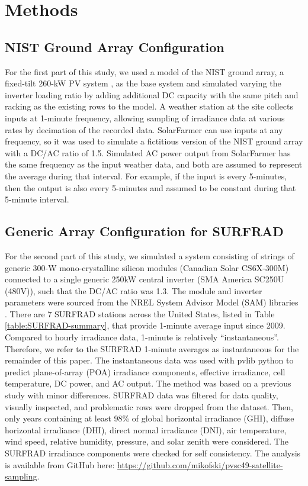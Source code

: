\documentclass[conference]{IEEEtran}
\begin{document}
\section{Methods}

\subsection{NIST Ground Array Configuration}
For the first part of this study, we used a model of the NIST ground array, a fixed-tilt 260-kW PV system \cite{Boyd2017,Boyd2017a,Boyd2017b}, as the base system and simulated varying the inverter loading ratio by adding additional DC capacity with the same pitch and racking as the existing rows to the model. A weather station at the site collects inputs at 1-minute frequency, allowing sampling of irradiance data at various rates by decimation of the recorded data. SolarFarmer \cite{solarfarmer2018} can use inputs at any frequency, so it was used to simulate a fictitious version of the NIST ground array with a DC/AC ratio of 1.5. Simulated AC power output from SolarFarmer has the same frequency as the input weather data, and both are assumed to represent the average during that interval. For example, if the input is every 5-minutes, then the output is also every 5-minutes and assumed to be constant during that 5-minute interval.

\subsection{Generic Array Configuration for SURFRAD}
For the second part of this study, we simulated a system consisting of strings of generic 300-W mono-crystalline silicon modules (Canadian Solar CS6X-300M) connected to a single generic 250kW central inverter (SMA America SC250U (480V)), such that the DC/AC ratio was 1.3. The module and inverter parameters were sourced from the NREL System Advisor Model (SAM) libraries \cite{Freeman2018}. There are 7 SURFRAD \cite{Augustine2000} stations across the United States, listed in Table \ref{table:SURFRAD-summary}, that provide 1-minute average input since 2009. Compared to hourly irradiance data, 1-minute is relatively ``instantaneous''. Therefore, we refer to the SURFRAD 1-minute averages as instantaneous for the remainder of this paper. The instantaneous data was used with pvlib python \cite{pvlib2018} to predict plane-of-array (POA) irradiance components, effective irradiance, cell temperature, DC power, and AC output. The method was based on a previous study \cite{9519024} with minor differences. SURFRAD data was filtered for data quality, visually inspected, and problematic rows were dropped from the dataset. Then, only years containing at least 98\% of global horizontal irradiance (GHI), diffuse horizontal irradiance (DHI), direct normal irradiance (DNI), air temperature, wind speed, relative humidity, pressure, and solar zenith were considered. The SURFRAD irradiance components were checked for self consistency. The analysis is available from GitHub here: \url{https://github.com/mikofski/pvsc49-satellite-sampling}.
\end{document}
